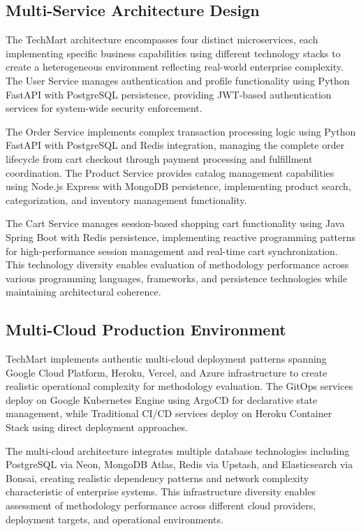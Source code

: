 \subsection{Multi-Service Architecture Design}
The TechMart architecture encompasses four distinct microservices, each implementing specific business capabilities using different technology stacks to create a heterogeneous environment reflecting real-world enterprise complexity. The User Service manages authentication and profile functionality using Python FastAPI with PostgreSQL persistence, providing JWT-based authentication services for system-wide security enforcement.

The Order Service implements complex transaction processing logic using Python FastAPI with PostgreSQL and Redis integration, managing the complete order lifecycle from cart checkout through payment processing and fulfillment coordination. The Product Service provides catalog management capabilities using Node.js Express with MongoDB persistence, implementing product search, categorization, and inventory management functionality.

The Cart Service manages session-based shopping cart functionality using Java Spring Boot with Redis persistence, implementing reactive programming patterns for high-performance session management and real-time cart synchronization. This technology diversity enables evaluation of methodology performance across various programming languages, frameworks, and persistence technologies while maintaining architectural coherence.

\subsection{Multi-Cloud Production Environment}
TechMart implements authentic multi-cloud deployment patterns spanning Google Cloud Platform, Heroku, Vercel, and Azure infrastructure to create realistic operational complexity for methodology evaluation. The GitOps services deploy on Google Kubernetes Engine using ArgoCD for declarative state management, while Traditional CI/CD services deploy on Heroku Container Stack using direct deployment approaches.

The multi-cloud architecture integrates multiple database technologies including PostgreSQL via Neon, MongoDB Atlas, Redis via Upstash, and Elasticsearch via Bonsai, creating realistic dependency patterns and network complexity characteristic of enterprise systems. This infrastructure diversity enables assessment of methodology performance across different cloud providers, deployment targets, and operational environments.


